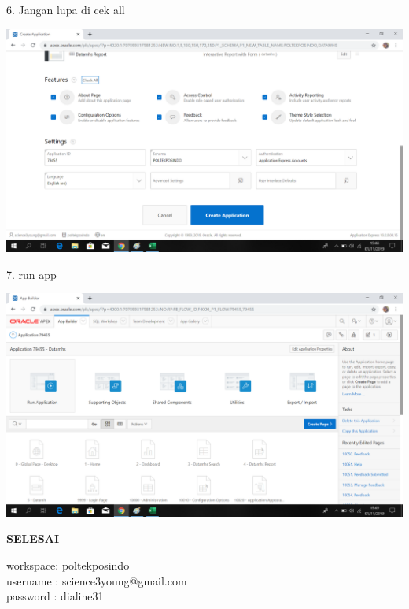 \documentclass{article}
\begin{document}
\item 6. Jangan lupa di cek all
\begin{center}
\includegraphics[width=10cm\textwidth]{figure/8chekall.png}
\end{center}

\item 7. run app
\begin{center}
    \includegraphics[width=10cm\textwidth]{figure/9run.png}
\end{center}

\item \textbf{SELESAI}

workspace: poltekposindo\\
username : science3young@gmail.com\\
password : dialine31\\
\end{document}
